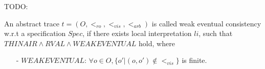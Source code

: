 {\color {blue}TODO:

\begin{definition}
\label{definition:eventual consistency}
An abstract trace $t = (O,<_{\mathit{ro}},<_{\mathit{vis}},<_{\mathit{arb}})$ is called weak eventual consistency w.r.t a specification $Spec$, if there exists local interpretation $li$, such that $\mathit{THINAIR} \wedge \mathit{RVAL} \wedge \mathit{WEAKEVENTUAL}$ hold, where

\begin{itemize}
\setlength{\itemsep}{0.5pt}
\item[-] $\mathit{WEAKEVENTUAL}$: $\forall o \in O, \{ o' \vert (o,o') \notin <_{\mathit{vis}} \}$ is finite.
\end{itemize}
\end{definition}

}














